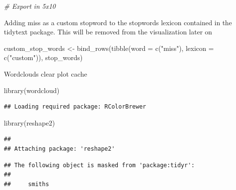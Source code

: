 \documentclass[
]{article}
\newenvironment{Shaded}{\begin{snugshade}}{\end{snugshade}}
\newcommand{\AttributeTok}[1]{\textcolor[rgb]{0.77,0.63,0.00}{#1}}
\newcommand{\CommentTok}[1]{\textcolor[rgb]{0.56,0.35,0.01}{\textit{#1}}}
\newcommand{\FunctionTok}[1]{\textcolor[rgb]{0.00,0.00,0.00}{#1}}
\newcommand{\NormalTok}[1]{#1}
\newcommand{\OtherTok}[1]{\textcolor[rgb]{0.56,0.35,0.01}{#1}}
\newcommand{\StringTok}[1]{\textcolor[rgb]{0.31,0.60,0.02}{#1}}
\begin{document}
\begin{Shaded}
\begin{Highlighting}[]
\CommentTok{\# Export in 5x10}
\end{Highlighting}
\end{Shaded}

Adding miss as a custom stopword to the stopwords lexicon contained in
the tidytext package. This will be removed from the visualization later
on

\begin{Shaded}
\begin{Highlighting}[]
\NormalTok{custom\_stop\_words }\OtherTok{\textless{}{-}} \FunctionTok{bind\_rows}\NormalTok{(}\FunctionTok{tibble}\NormalTok{(}\AttributeTok{word =} \FunctionTok{c}\NormalTok{(}\StringTok{"miss"}\NormalTok{),  }
                                      \AttributeTok{lexicon =} \FunctionTok{c}\NormalTok{(}\StringTok{"custom"}\NormalTok{)), }
\NormalTok{                               stop\_words)}
\end{Highlighting}
\end{Shaded}

Wordclouds clear plot cache

\begin{Shaded}
\begin{Highlighting}[]
\FunctionTok{library}\NormalTok{(wordcloud)}
\end{Highlighting}
\end{Shaded}

\begin{verbatim}
## Loading required package: RColorBrewer
\end{verbatim}

\begin{Shaded}
\begin{Highlighting}[]
\FunctionTok{library}\NormalTok{(reshape2)}
\end{Highlighting}
\end{Shaded}

\begin{verbatim}
## 
## Attaching package: 'reshape2'
\end{verbatim}

\begin{verbatim}
## The following object is masked from 'package:tidyr':
## 
##     smiths
\end{verbatim}
\end{document}
